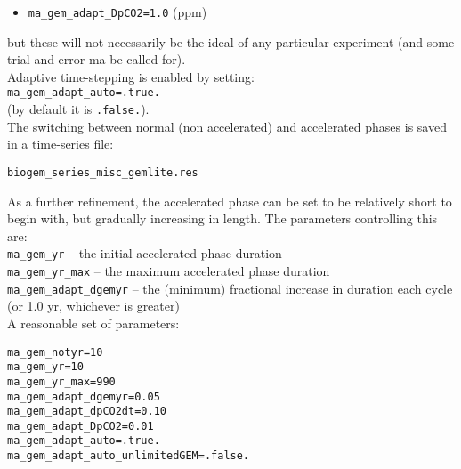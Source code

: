 \documentclass[11pt,fleqn]{book} %
\begin{document}
\begin{enumerate}
\begin{itemize}
\vspace{1mm}
        \item \texttt{ma\_gem\_adapt\_DpCO2=1.0} (ppm)
\end{itemize}
but these will not necessarily be the ideal of any particular experiment (and some trial-and-error ma be called for).
\\Adaptive time-stepping is enabled by setting:
\\\texttt{ma\_gem\_adapt\_auto=.true.}
\\(by default it is \texttt{.false.}).
\\The switching between normal (non accelerated) and accelerated phases is saved in a time-series file:
\vspace{-1mm}\begin{verbatim}biogem_series_misc_gemlite.res\end{verbatim}\vspace{-1mm}

As a further refinement, the accelerated phase can be set to be relatively short to begin with, but gradually increasing in length. The parameters controlling this are:
\\\texttt{ma\_gem\_yr} -- the initial accelerated phase duration
\\\texttt{ma\_gem\_yr\_max} -- the maximum accelerated phase duration
\\\texttt{ma\_gem\_adapt\_dgemyr} -- the (minimum) fractional increase in duration each cycle (or 1.0 yr, whichever is greater)
\\ A reasonable set of parameters:
\vspace{-1mm}\begin{verbatim}
ma_gem_notyr=10
ma_gem_yr=10
ma_gem_yr_max=990
ma_gem_adapt_dgemyr=0.05
ma_gem_adapt_dpCO2dt=0.10
ma_gem_adapt_DpCO2=0.01
ma_gem_adapt_auto=.true.
ma_gem_adapt_auto_unlimitedGEM=.false.
\end{verbatim}\vspace{-1mm}

\end{enumerate}
\vspace{2mm}
\end{document}
